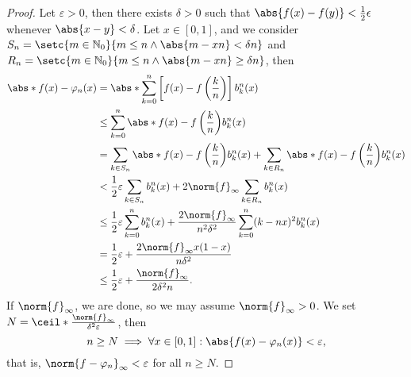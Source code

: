 \begin{proof}
     Let \(\varepsilon > 0\), then there exists \(\delta > 0\) such that \(\abs{f(x) - f(y)} < \frac12\epsilon\) whenever \(\abs{x - y} < \delta\). Let \(x \in [0,1]\), and we consider \(S_n = \setc{m \in \mathbb{N}_0}{m \leq n \land \abs{m - xn} < \delta n}\) and \(R_n = \setc{m \in \mathbb{N}_0}{m \leq n \land \abs{m - xn} \geq \delta n}\), then
    \begin{align*}
        \abs*{f(x) - \varphi_n(x)} &= \abs*{\sum_{k = 0}^n \left[f(x) - f\left(\frac{k}{n}\right)\right]b^n_k(x)}\\
                                  &\leq \sum_{k = 0}^n \abs*{f(x) - f\left(\frac{k}{n}\right)}b^n_k(x)\\
                                  &= \sum_{k \in S_n} \abs*{f(x) - f\left(\frac{k}{n}\right)}b^n_k(x) + \sum_{k \in R_n} \abs*{f(x) - f\left(\frac{k}{n}\right)}b^n_k(x)\\
                                  &< \frac12\varepsilon \sum_{k \in S_n} b^n_k(x) + 2 \norm{f}_\infty \sum_{k \in R_n} b^n_k(x)\\
                                  &\leq \frac12 \varepsilon \sum_{k = 0}^n b^n_k(x) + \frac{2\norm{f}_\infty}{n^2 \delta^2}\sum_{k=0}^n (k - nx)^2 b^n_k(x)\\
                                  &= \frac12 \varepsilon + \frac{2 \norm{f}_{\infty}x(1 - x)}{n \delta^2}\\
                                  &\leq \frac12 \varepsilon + \frac{\norm{f}_\infty}{2 \delta^2 n}.
    \end{align*}
    If \(\norm{f}_\infty\), we are done, so we may assume \(\norm{f}_\infty > 0\). We set \(N = \ceil*{\frac{\norm{f}_\infty}{\delta^2 \varepsilon}}\), then
    \begin{equation*}
        n \geq N \implies \forall x \in [0,1]: \abs{f(x) - \varphi_n(x)} < \varepsilon,
    \end{equation*}
    that is, \(\norm{f - \varphi_n}_\infty < \varepsilon\) for all \(n \geq N\).
\end{proof}


